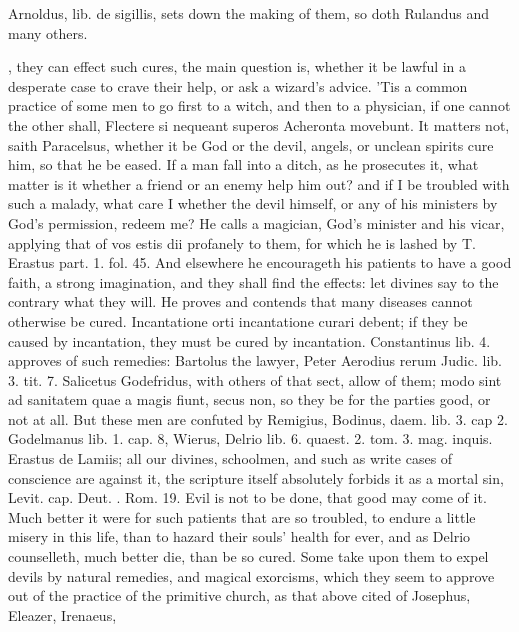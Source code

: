 {Arnoldus, lib. de sigillis, sets down the making of them, so doth
Rulandus and many others.

, they can effect such cures, the main question is, whether
it be lawful in a desperate case to crave their help, or ask a wizard's
advice. 'Tis a common practice of some men to go first to a witch, and
then to a physician, if one cannot the other shall, Flectere si
nequeant superos Acheronta movebunt. It matters not, saith
Paracelsus, whether it be God or the devil, angels, or unclean spirits
cure him, so that he be eased. If a man fall into a ditch, as he
prosecutes it, what matter is it whether a friend or an enemy help him
out? and if I be troubled with such a malady, what care I whether the
devil himself, or any of his ministers by God's permission, redeem me?
He calls a  magician, God's minister and his vicar, applying that
of vos estis dii profanely to them, for which he is lashed by T.
Erastus part. 1. fol. 45. And elsewhere he encourageth his patients to
have a good faith,  a strong imagination, and they shall find the
effects: let divines say to the contrary what they will. He proves and
contends that many diseases cannot otherwise be cured. Incantatione
orti incantatione curari debent; if they be caused by incantation,
they must be cured by incantation. Constantinus lib. 4. approves
of such remedies: Bartolus the lawyer, Peter Aerodius rerum Judic. lib.
3. tit. 7. Salicetus Godefridus, with others of that sect, allow of
them; modo sint ad sanitatem quae a magis fiunt, secus non, so they be
for the parties good, or not at all. But these men are confuted by
Remigius, Bodinus, daem. lib. 3. cap 2. Godelmanus lib. 1. cap. 8,
Wierus, Delrio lib. 6. quaest. 2. tom. 3. mag. inquis. Erastus de
Lamiis; all our divines, schoolmen, and such as write cases of
conscience are against it, the scripture itself absolutely forbids it
as a mortal sin, Levit. cap.    Deut.  \etc{}. Rom.
 19. Evil is not to be done, that good may come of it. Much better
it were for such patients that are so troubled, to endure a little
misery in this life, than to hazard their souls' health for ever, and
as Delrio counselleth, much better die, than be so cured. Some
take upon them to expel devils by natural remedies, and magical
exorcisms, which they seem to approve out of the practice of the
primitive church, as that above cited of Josephus, Eleazer, Irenaeus,
}
